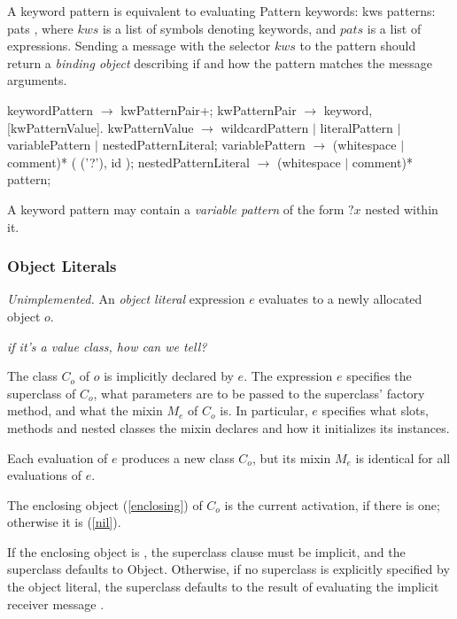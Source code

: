 \documentclass{article}
\newcommand{\code}[1]{{\sf #1}}
\begin{document}
A keyword pattern is equivalent to evaluating \code{Pattern keywords: kws patterns: pats }, where $kws$ is a list of symbols denoting keywords, and $pats$ is a list of expressions.  Sending a message with the selector $kws$ to the pattern should return a {\em binding object} describing if and how the pattern matches the message arguments.

\begin{newspeak}
keywordPattern $\rightarrow$ kwPatternPair+; 
kwPatternPair $\rightarrow$ keyword, [kwPatternValue]. 
kwPatternValue $\rightarrow$ wildcardPattern $|$ literalPattern $|$ variablePattern $|$ nestedPatternLiteral; 
variablePattern $\rightarrow$ (whitespace $|$ comment)*  ( ('?'), id ); 
nestedPatternLiteral $\rightarrow$ (whitespace $|$ comment)*  pattern;
\end{newspeak}


A keyword pattern may contain a {\em variable pattern} of the form $?x$ nested within it. 

\subsubsection{Object Literals}
\label{objLiteral}

{\it Unimplemented.}
An {\em object literal} expression $e$ evaluates to a newly allocated object $o$. 

{\it if it's a value class, how can we tell?}

The class $C_o$ of $o$ is implicitly declared by $e$. The expression $e$ specifies the superclass of $C_o$, what parameters are to be passed to the superclass' factory method, and what the mixin $M_e$ of $C_o$ is. In particular, $e$ specifies what slots, methods and nested classes the mixin declares and how it initializes its instances.

Each evaluation of $e$ produces a new class $C_o$, but its mixin $M_e$ is identical for all evaluations of $e$.

The enclosing object (\ref{enclosing}) of $C_o$  is the current activation,
if there is one; otherwise it is \NIL{} (\ref{nil}).

If the enclosing object is \NIL{}, the superclass clause must be implicit, and the superclass defaults to \code{Object}. Otherwise, if no superclass is explicitly specified by the object literal, the superclass defaults to the result of evaluating the implicit receiver message  . 
\end{document}
